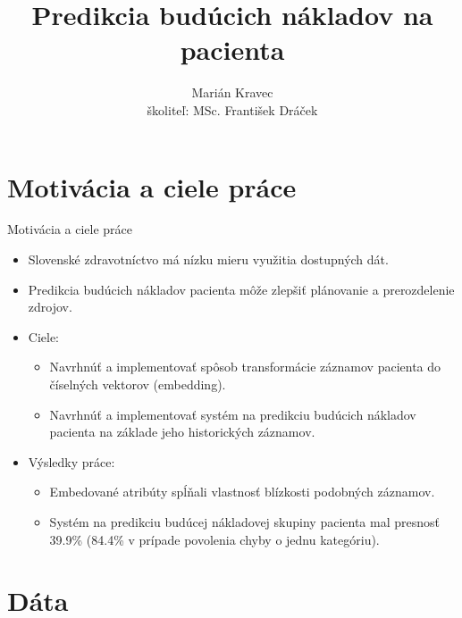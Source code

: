 \documentclass[slovak,10pt]{beamer}
\title[Predikcia budúcich nákladov na pacienta]{Predikcia budúcich nákladov na pacienta}
\author[]{Marián Kravec \\ školiteľ: MSc. František Dráček }
\date{}
\begin{document}
\begin{frame}
  \titlepage
\end{frame}




\section{Motivácia a ciele práce}

\begin{frame}{Motivácia a ciele práce}
	\begin{itemize}
		\item<1> Slovenské zdravotníctvo má nízku mieru využitia dostupných dát.
		\item<1> Predikcia budúcich nákladov pacienta môže zlepšiť plánovanie a prerozdelenie zdrojov.
		\item<1> Ciele:
		\begin{itemize}
			\item<1> Navrhnúť a implementovať spôsob transformácie záznamov pacienta do číselných vektorov (embedding).
			\item<1> Navrhnúť a implementovať systém na predikciu budúcich nákladov pacienta na základe jeho historických záznamov.
		\end{itemize}
		\item<1> Výsledky práce:
		\begin{itemize}
			\item<1> Embedované atribúty spĺňali vlastnosť blízkosti podobných záznamov.
			\item<1> Systém na predikciu budúcej nákladovej skupiny pacienta mal presnosť 39.9\% (84.4\% v prípade povolenia chyby o jednu kategóriu).
		\end{itemize}
	\end{itemize}
\end{frame}


\section{Dáta}
\end{document}

